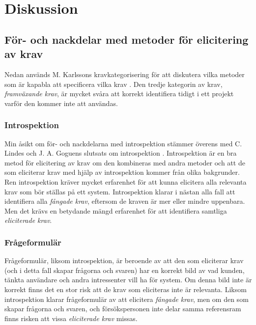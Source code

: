 \section{Diskussion}
\label{sec:discussion-jannering}

\subsection{För- och nackdelar med metoder för elicitering av krav}
Nedan används M. Karlssons kravkategorisering för att diskutera vilka metoder som är kapabla att specificera vilka krav \cite{lkp.26083619960101}. Den tredje kategorin av krav, \textit{framväxande krav}, är mycket svåra att korrekt identifiera tidigt i ett projekt varför den kommer inte att användas.
\subsubsection{Introspektion}
Min åsikt om för- och nackdelarna med introspektion stämmer överens med C. Lindes och J. A. Goguens slutsats om introspektion \cite{goguen1993techniques}. Introspektion är en bra metod för elicitering av krav om den kombineras med andra metoder och att de som eliciterar krav med hjälp av introspektion kommer från olika bakgrunder. Ren introspektion kräver mycket erfarenhet för att kunna elicitera alla relevanta krav som bör ställas på ett system. Introspektion klarar i nästan alla fall att identifiera alla \textit{fångade krav}, eftersom de kraven är mer eller mindre uppenbara. Men det krävs en betydande mängd erfarenhet för att identifiera samtliga \textit{eliciterade krav}.

\subsubsection{Frågeformulär}
Frågeformulär, liksom introspektion, är beroende av att den som eliciterar krav (och i detta fall skapar frågorna och svaren) har en korrekt bild av vad kunden, tänkta användare och andra intressenter vill ha för system. Om denna bild inte är korrekt finns det en stor risk att de krav som eliciteras inte är relevanta. Liksom introspektion klarar frågeformulär av att elicitera \textit{fångade krav}, men om den som skapar frågorna och svaren, och försökspersonen inte delar samma referensram finns risken att vissa \textit{eliciterade krav} missas. 

